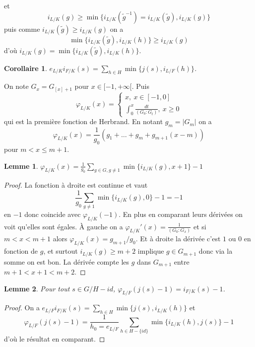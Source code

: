 \documentclass[a4paper,12pt]{book}
\theoremstyle{plain}
\newtheorem{lem}{Lemme}
\newtheorem{cor}{Corollaire}
\theoremstyle{definition}
\theoremstyle{remark}
\begin{document}
et 
\[i_{L/K}(g)\geq \min\{i_{L/K}(\tilde g^{-1})=i_{L/K}(\tilde g),i_{L/K}(g)\}\]
puis comme $i_{L/K}(\tilde g)\geq i_{L/K}(g)$ on a
\[\min\{i_{L/K}(\tilde g),i_{L/K}(h)\}\geq i_{L/K}(g)\]
d'où $i_{L/K}(g)=\min\{i_{L/K}(\tilde g),i_{L/K}(h)\}$.
\begin{cor}
    $e_{L/K}i_{F/K}(s)=\sum_{h\in H}\min\{j(s),i_{L/F}(h)\}$.
\end{cor}
On note $G_x=G_{[x]+1}$ pour $x\in [-1,+\infty[$. Puis
\[\varphi_{L/K}(x)=\begin{cases} x,~x\in [-1,0]\\
    \int_0^x \frac{dt}{(G_0:G_t)},~x\geq 0
\end{cases}\]
qui est la première fonction de Herbrand. En notant $g_m=|G_m|$
on a 
\[\varphi_{L/K}(x)=\frac{1}{g_0}(g_1+\ldots+g_m+g_{m+1}(x-m))\]
pour $m<x\leq m+1$.

\begin{lem}
    $\varphi_{L/K}(x)=\frac{1}{g_0}\sum_{g\in G,g\ne 1}\min\{i_{L/K}(g),x+1\}-1$
\end{lem}
\begin{proof}
    La fonction à droite est continue et vaut 
    \[\frac{1}{g_0}\sum_{g\ne 1}\min\{i_{L/K}(g),0\}-1=-1\]
    en $-1$ donc coincide avec $\varphi_{L/K}(-1)$. En plus en
    comparant leurs dérivées on voit qu'elles sont égales. À
    gauche on a $\varphi_{L/K}'(x)=\frac{1}{(G_0:G_x)}$ et
    si $m<x<m+1$ alors $\varphi_{L/K}(x)=g_{m+1}/g_0$. Et
    à droite la dérivée c'est $1$ ou $0$ en fonction de $g$,
    et surtout $i_{L/K}(g)\geq m+2$ implique $g\in G_{m+1}$ donc
    via la somme on est bon. La dérivée compte les $g$ dans 
    $G_{m+1}$ entre $m+1<x+1<m+2$.
\end{proof}

\begin{lem}
    Pour tout $s\in G/H - id$, 
    $\varphi_{L/F}(j(s)-1)=i_{F/K}(s)-1$.
\end{lem}
\begin{proof}
    On a $e_{L/F}i_{F/K}(s)=\sum_{h\in H}\min\{j(s),i_{L/K}(h)\}$
    et 
\[\varphi_{L/F}(j(s)-1)=\frac{1}{h_0=e_{L/F}}\sum_{h\in H-\{id\}} \min\{i_{L/K}(h),j(s)\}-1\]
    d'où le résultat en comparant.
\end{proof}
\end{document}
